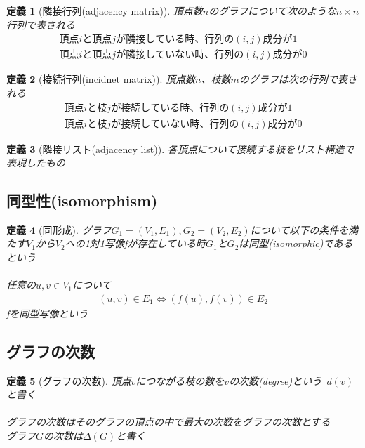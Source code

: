 \documentclass[a4j,10.5pt]{jarticle}
\newtheorem{defi}{定義}[section]
\begin{document}
\begin{defi}[隣接行列(adjacency matrix)]
頂点数$n$のグラフについて次のような$n \times n$行列で表される
\begin{eqnarray*}
頂点iと頂点jが隣接している時、行列の(i,j)成分が1\\
頂点iと頂点jが隣接していない時、行列の(i,j)成分が0
\end{eqnarray*}
\end{defi}

\begin{defi}[接続行列(incidnet matrix)]
頂点数$n$、枝数$m$のグラフは次の行列で表される
\begin{eqnarray*}
頂点iと枝jが接続している時、行列の(i,j)成分が1\\
頂点iと枝jが接続していない時、行列の(i,j)成分が0
\end{eqnarray*}
\end{defi}

\begin{defi}[隣接リスト(adjacency list)]
各頂点について接続する枝をリスト構造で表現したもの
\end{defi}

\subsection*{同型性(isomorphism)}
\begin{defi}[同形成]
グラフ$G_1=(V_1,E_1),G_2=(V_2,E_2)$について以下の条件を満たす$V_1$から$V_2$への1対1写像fが存在している時$G_1$と$G_2$は同型(isomorphic)であるという\\
\\
任意の$u,v \in V_1$について
\begin{eqnarray*}
(u,v) \in E_1 \Leftrightarrow (f(u),f(v)) \in E_2
\end{eqnarray*}
fを同型写像という
\end{defi}

\subsection{グラフの次数}
\begin{defi}[グラフの次数]
頂点$v$につながる枝の数を$v$の次数(degree)という\ $d(v)$と書く\\
\\
グラフの次数はそのグラフの頂点の中で最大の次数をグラフの次数とする\\
グラフ$G$の次数は$\Delta(G)$と書く
\end{defi}
\end{document}
